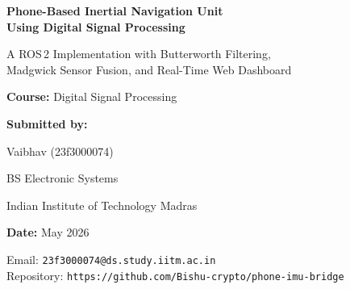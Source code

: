 \documentclass[12pt,a4paper]{article}
\begin{document}
\begin{titlepage}
\centering
\vspace*{2cm}
{\Huge\bfseries Phone-Based Inertial Navigation Unit\\[0.3cm]
Using Digital Signal Processing\par}
\vspace{1cm}
{\Large A ROS\,2 Implementation with Butterworth Filtering,\\
Madgwick Sensor Fusion, and Real-Time Web Dashboard\par}
\vspace{2cm}
{\large\textbf{Course:} Digital Signal Processing\par}
\vspace{0.5cm}
{\large\textbf{Submitted by:}\par}
\vspace{0.3cm}
{\Large Vaibhav (23f3000074)\par}
\vspace{0.3cm}
{\large BS Electronic Systems\par}
{\large Indian Institute of Technology Madras\par}
\vspace{1.5cm}
{\large\textbf{Date:} May 2026\par}
\vfill
{\small Email: \texttt{23f3000074@ds.study.iitm.ac.in}\\
Repository: \texttt{https://github.com/Bishu-crypto/phone-imu-bridge}}
\end{titlepage}

\begin{abstract}
This project implements a real-time \textbf{Inertial Navigation Unit (INU)} that transforms a smartphone into an inertial measurement unit (IMU) using its built-in accelerometer and gyroscope. The system streams 6-axis IMU data via HTTP to a ROS\,2 processing pipeline that applies: (1)~\textbf{Madgwick gradient-descent sensor fusion} for orientation estimation, (2)~a \textbf{2nd-order Butterworth IIR low-pass filter} designed via the bilinear transform for noise suppression, (3)~quaternion-based \textbf{gravity removal}, (4)~\textbf{trapezoidal numerical integration} for velocity and displacement estimation, and (5)~\textbf{Zero-Velocity Updates (ZUPT)} for drift mitigation. A companion web dashboard provides real-time visualization of orientation, acceleration, navigation state, and FFT-based spectral analysis. All DSP algorithms are implemented from first principles without reliance on \texttt{scipy.signal}.
\end{abstract}
\end{document}
